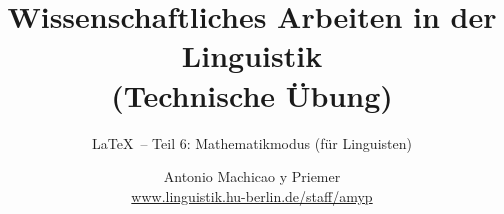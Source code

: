


\title{
	\textbf{Wissenschaftliches Arbeiten in der Linguistik}\\
	\textbf{(Technische Übung)}
}

\subtitle{\LaTeX\ -- Teil 6: Mathematikmodus (für Linguisten)}

\author[aMyP]{
	{\small Antonio Machicao y Priemer}
	\\
	{\footnotesize \url{www.linguistik.hu-berlin.de/staff/amyp}}
}


\date{ }






\begin{frame}
  \HUtitle
\end{frame}





\nocite{Freitag&MyP15a}
\nocite{Knuth1986}
\nocite{Kopka94a}
\nocite{MyP17c}
\nocite{MyP&Kerkhof16a}
	



